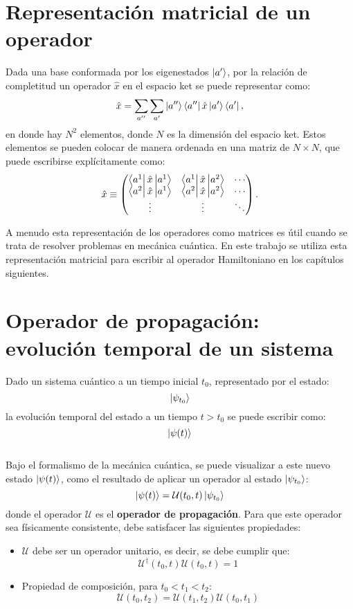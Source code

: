 \section{Representación matricial de un operador}
\noindent Dada una base conformada por los eigenestados $\ket{a'}$, por la relación de completitud un operador $\hat{x}$ en el espacio ket se puede representar como:
\begin{equation}
  \label{eq:xhat}
  \hat{x} = \sum_{a''}\sum_{a'}\ket{a''}\bra{a''}\hat{x}\ket{a'}\bra{a'},
\end{equation}
en donde hay $N^2$ elementos, donde $N$ es la dimensión del espacio ket. Estos elementos se pueden colocar de manera ordenada en una matriz de $N \times N$, que puede escribirse explícitamente como:
\begin{equation}
\hat{x}\equiv
\begin{pmatrix}
  \bra{a^1}\hat{x}\ket{a^1} & \bra{a^1}\hat{x}\ket{a^2} & \cdots \\
  \bra{a^2}\hat{x}\ket{a^1} & \bra{a^2}\hat{x}\ket{a^2} & \cdots \\
  \vdots & \vdots & \ddots
\end{pmatrix}.
\label{eq:xmatrix}
\end{equation}

A menudo esta representación de los operadores como matrices es útil cuando se trata de resolver problemas en mecánica cuántica. En este trabajo se utiliza esta representación matricial para escribir al operador Hamiltoniano en los capítulos siguientes. 

\section{Operador de propagación: evolución temporal de un sistema}

\noindent Dado un sistema cuántico a un tiempo inicial $t_0$, representado por el estado: $$\ket{\psi_{t_0}}$$ la evolución temporal del estado a un tiempo $t>t_0$ se puede escribir como: $$\ket{\psi(t)}$$
\\
Bajo el formalismo de la mecánica cuántica, se puede visualizar a este nuevo estado $\ket{\psi(t)}$, como el resultado de aplicar un operador al estado $\ket{\psi_{t_0}}$:
$$\ket{\psi(t)}=\mathcal{U}(t_0,t)\ket{\psi_{t_0}}$$
donde el operador $\mathcal{U}$ es el \textbf{operador de propagación}. Para que este operador sea físicamente consistente, debe satisfacer las siguientes propiedades:

\begin{itemize}[label=\textcolor{CTtitle}{\textbullet}]
\item $\mathcal{U}$ debe ser un operador unitario, es decir, se debe cumplir que: $$\mathcal{U}^\dag(t_0,t)\mathcal{U}(t_0,t)=1$$
\item Propiedad de composición, para $t_0<t_1<t_2$: $$\mathcal{U}(t_0,t_2) = \mathcal{U}(t_1,t_2)\mathcal{U}(t_0,t_1)$$  
\end{itemize}

